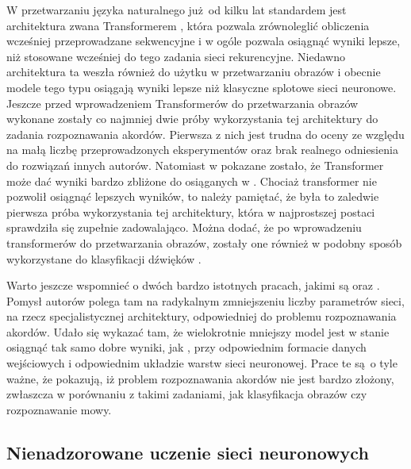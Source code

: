 W przetwarzaniu języka naturalnego już od kilku lat standardem jest architektura zwana Transformerem \cite{vaswani_attention_2017}, która pozwala zrównoleglić obliczenia wcześniej przeprowadzane sekwencyjne i w ogóle pozwala osiągnąć wyniki lepsze, niż stosowane wcześniej do tego zadania sieci rekurencyjne. Niedawno architektura ta weszła również do użytku w przetwarzaniu obrazów \cite{dosovitskiy_image_2021} i obecnie modele tego typu osiągają wyniki lepsze niż klasyczne splotowe sieci neuronowe. Jeszcze przed wprowadzeniem Transformerów do przetwarzania obrazów wykonane zostały co najmniej dwie próby wykorzystania tej architektury do zadania rozpoznawania akordów. Pierwsza z nich \cite{chen_harmony_2019} jest trudna do oceny ze względu na małą liczbę przeprowadzonych eksperymentów oraz brak realnego odniesienia do rozwiązań innych autorów. Natomiast w \cite{park_bi-directional_2019} pokazane zostało, że Transformer może dać wyniki bardzo zbliżone do osiąganych w \cite{korzeniowski_fully_2016}. Chociaż transformer nie pozwolił osiągnąć lepszych wyników, to należy pamiętać, że była to zaledwie pierwsza próba wykorzystania tej architektury, która w najprostszej postaci sprawdziła się zupełnie zadowalająco. Można dodać, że po wprowadzeniu transformerów do przetwarzania obrazów, zostały one również w podobny sposób wykorzystane do klasyfikacji dźwięków \cite{gong_ast_2021}.

Warto jeszcze wspomnieć o dwóch bardzo istotnych pracach, jakimi są \cite{hanlon_fifthnet_2020} oraz \cite{ohanlon_fifthnet_2021}. Pomysł autorów polega tam na radykalnym zmniejszeniu liczby parametrów sieci, na rzecz specjalistycznej architektury, odpowiedniej do problemu rozpoznawania akordów. Udało się wykazać tam, że wielokrotnie mniejszy model jest w stanie osiągnąć tak samo dobre wyniki, jak \cite{korzeniowski_fully_2016}, przy odpowiednim formacie danych wejściowych i odpowiednim układzie warstw sieci neuronowej. Prace te są o tyle ważne, że pokazują, iż problem rozpoznawania akordów nie jest bardzo złożony, zwłaszcza w porównaniu z takimi zadaniami, jak klasyfikacja obrazów czy rozpoznawanie mowy.

\subsection{Nienadzorowane uczenie sieci neuronowych}

